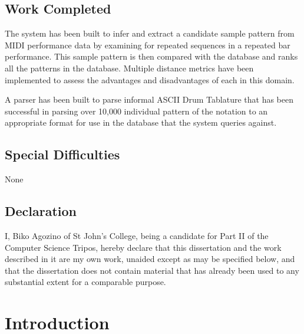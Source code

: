 \documentclass[12pt,twoside,notitlepage]{report}
\begin{document}
\section*{Work Completed}
The system has been built to infer and extract a candidate sample pattern from MIDI performance data by examining for repeated sequences in a repeated bar performance. This sample pattern is then compared with the database and ranks all the patterns in the database. Multiple distance metrics have been implemented to assess the advantages and disadvantages of each in this domain.

A parser has been built to parse informal ASCII Drum Tablature that has been successful in parsing over 10,000 individual pattern of the notation to an appropriate format for use in the database that the system queries against.


\section*{Special Difficulties}

None
 
\newpage
\section*{Declaration}

I, Biko Agozino of St John's College, being a candidate for Part II of the Computer Science Tripos, hereby declare that this dissertation and the work described in it are my own work, unaided except as may be specified below, and that the dissertation does not contain material that has already been used to any substantial extent for a comparable purpose.

\bigskip
{}

\medskip
{}

\cleardoublepage

\tableofcontents


\newpage



\cleardoublepage        %

\setcounter{page}{1}
\pagestyle{headings}

\chapter{Introduction}
\end{document}
